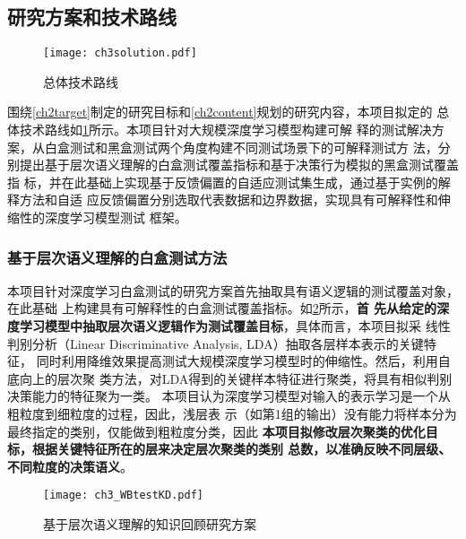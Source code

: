 \subsection{研究方案和技术路线}

\begin{figure}[h]
    \begin{small}
        \begin{center}
            \texttt{[image: ch3solution.pdf]}
        \end{center}
        \caption{总体技术路线}
        \label{fig:ch3:solution}
    \end{small}
\end{figure}

围绕\ref{ch2target}制定的研究目标和\ref{ch2content}规划的研究内容，本项目拟定的
总体技术路线如\cref{fig:ch3:solution}所示。本项目针对大规模深度学习模型构建可解
释的测试解决方案，从白盒测试和黑盒测试两个角度构建不同测试场景下的可解释测试方
法，分别提出基于层次语义理解的白盒测试覆盖指标和基于决策行为模拟的黑盒测试覆盖指
标，并在此基础上实现基于反馈偏置的自适应测试集生成，通过基于实例的解释方法和自适
应反馈偏置分别选取代表数据和边界数据，实现具有可解释性和伸缩性的深度学习模型测试
框架。

\subsubsection{基于层次语义理解的白盒测试方法}\label{ch3_2}

本项目针对深度学习白盒测试的研究方案首先抽取具有语义逻辑的测试覆盖对象，在此基础
上构建具有可解释性的白盒测试覆盖指标。如\cref{fig:ch3:WBtestKD}所示，\textbf{首
先从给定的深度学习模型中抽取层次语义逻辑作为测试覆盖目标}，具体而言，本项目拟采
线性判别分析（Linear Discriminative Analysis, LDA）抽取各层样本表示的关键特征，
同时利用降维效果提高测试大规模深度学习模型时的伸缩性。然后，利用自底向上的层次聚
类方法，对LDA得到的关键样本特征进行聚类，将具有相似判别决策能力的特征聚为一类。
本项目认为深度学习模型对输入的表示学习是一个从粗粒度到细粒度的过程，因此，浅层表
示（如第1组的输出）没有能力将样本分为最终指定的类别，仅能做到粗粒度分类，因此
\textbf{本项目拟修改层次聚类的优化目标，根据关键特征所在的层来决定层次聚类的类别
总数，以准确反映不同层级、不同粒度的决策语义}。

\begin{figure}[htp]
    \begin{small}
        \begin{center}
            \texttt{[image: ch3\_WBtestKD.pdf]}
        \end{center}
        \caption{基于层次语义理解的知识回顾研究方案}
        \label{fig:ch3:WBtestKD}
    \end{small}
\end{figure}


